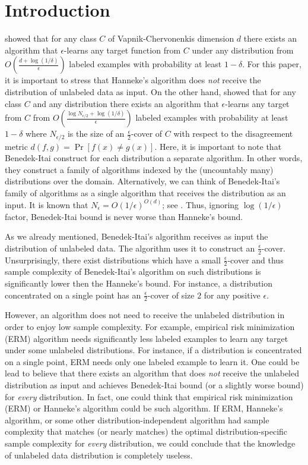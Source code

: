 \section{Introduction}
\label{section:introduction}

\citet{Hanneke-2016} showed that for any class $C$ of Vapnik-Chervonenkis
dimension $d$ there exists an algorithm that $\epsilon$-learns any target
function from $C$ under any distribution from $O\left(\frac{d +
\log(1/\delta)}{\epsilon}\right)$ labeled examples with probability at least
$1-\delta$. For this paper, it is important to stress that Hanneke's algorithm
does \emph{not} receive the distribution of unlabeled data as input. On the
other hand, \citet{Benedek-Itai-1991} showed that for any class $C$ and any
distribution there exists an algorithm that $\epsilon$-learns any target from
$C$ from $O \left( \frac{\log N_{\epsilon/2} + \log
(1/\delta)}{\epsilon}\right)$ labeled examples with probability at least
$1-\delta$ where $N_{\epsilon/2}$ is the size of an $\frac{\epsilon}{2}$-cover
of $C$ with respect to the disagreement metric $d(f,g) = \Pr[f(x) \neq g(x)]$.
Here, it is important to note that Benedek-Itai construct for each distribution
a separate algorithm. In other words, they construct a family of algorithms
indexed by the (uncountably many) distributions over the domain. Alternatively,
we can think of Benedek-Itai's family of algorithms as a single algorithm that
receives the distribution as an input. It is known that $N_\epsilon =
O(1/\epsilon)^{O(d)}$; see \citet{Dudley-1978}. Thus, ignoring $\log(1/\epsilon)$
factor, Benedek-Itai bound is never worse than Hanneke's bound.

As we already mentioned, Benedek-Itai's algorithm receives as input the
distribution of unlabeled data. The algorithm uses it to construct an
$\frac{\epsilon}{2}$-cover. Unsurprisingly, there exist distributions which have
a small $\frac{\epsilon}{2}$-cover and thus sample complexity of Benedek-Itai's
algorithm on such distributions is significantly lower then the Hanneke's bound.
For instance, a distribution concentrated on a single point has an
$\frac{\epsilon}{2}$-cover of size $2$ for any positive $\epsilon$.

However, an algorithm does not need to receive the unlabeled distribution in
order to enjoy low sample complexity. For example, empirical risk minimization
(ERM) algorithm needs significantly less labeled examples to learn any target
under some unlabeled distributions. For instance, if a distribution is
concentrated on a single point, ERM needs only one labeled example to learn it.
One could be lead to believe that there exists an algorithm that does \emph{not}
receive the unlabeled distribution as input and achieves Benedek-Itai bound (or
a slightly worse bound) for \emph{every} distribution. In fact, one could think
that empirical risk minimization (ERM) or Hanneke's algorithm could be such
algorithm. If ERM, Hanneke's algorithm, or some other distribution-independent
algorithm had sample complexity that matches (or nearly matches) the optimal
distribution-specific sample complexity for \emph{every} distribution, we could
conclude that the knowledge of unlabeled data distribution is completely
useless.

